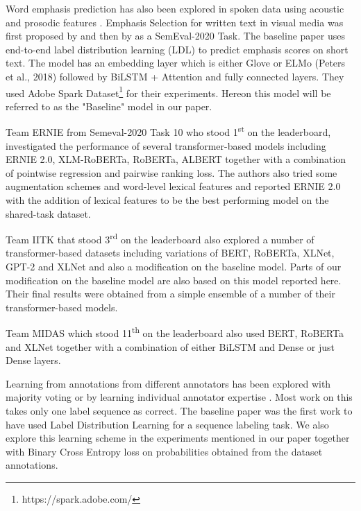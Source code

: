 \documentclass[letterpaper]{article} %
\begin{document}
Word emphasis prediction has also been explored in spoken data using acoustic and prosodic features \citep{mishra2012word,chen2017automatic}. Emphasis Selection for written text in visual media was first proposed by \citet{shirani2019learning} and then by \citet{shirani2020let} as a SemEval-2020 Task. The baseline paper \citep{shirani2019learning} uses end-to-end label distribution learning (LDL) to predict emphasis scores on short text. The model has an embedding layer which is either Glove  \citep{pennington2014glove}  or ELMo (Peters et al., 2018) followed by BiLSTM + Attention and fully connected layers. They used Adobe Spark Dataset\footnote{https://spark.adobe.com/} for their experiments. Hereon this model will be referred to as the "Baseline" model in our paper.

Team ERNIE \citep{huang2020ernie} from Semeval-2020 Task 10 who stood 1\textsuperscript{\rm st} on the leaderboard, investigated the performance of several transformer-based models including ERNIE 2.0, XLM-RoBERTa, RoBERTa, ALBERT together with a combination of pointwise regression and pairwise ranking loss. The authors also tried some augmentation schemes and word-level lexical features and reported ERNIE 2.0 with the addition of lexical features to be the best performing model on the shared-task dataset.

Team IITK \citep{singhal2020iitk} that stood 3\textsuperscript{\rm rd} on the leaderboard also explored a number of transformer-based datasets including variations of BERT, RoBERTa, XLNet, GPT-2 and XLNet and also a modification on the baseline model. Parts of our modification on the baseline model are also based on this model reported here. Their final results were obtained from a simple ensemble of a number of their transformer-based models.

Team MIDAS \citep{anand2020midas} which stood 11\textsuperscript{\rm th} on the leaderboard also used BERT, RoBERTa and XLNet together with a combination of either BiLSTM and Dense or just Dense layers.

Learning from annotations from different annotators has been explored with majority voting \citep{laws2011active} or by learning individual annotator expertise \citep{10.1145/3178876.3186033,rodrigues2017deep,Rodrigues2013SequenceLW}. Most work on this takes only one label sequence as correct. The baseline paper \citep{shirani2019learning}  was the first work to have used Label Distribution Learning \citep{geng2016label} for a sequence labeling task. We also explore this learning scheme in the experiments mentioned in our paper together with Binary Cross Entropy loss on probabilities obtained from the dataset annotations.
\end{document}
